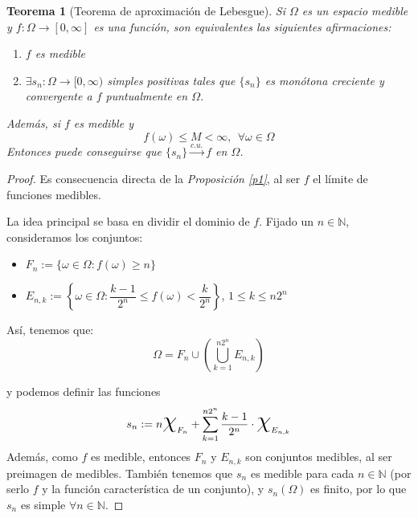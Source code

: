 \documentclass[11pt, a4paper]{article}
\theoremstyle{theorem-style}
\newtheorem{nth}{Teorema}[section]
\theoremstyle{definition-style}
\theoremstyle{remark-style}
\theoremstyle{example-style}
\newenvironment{nlist}
{\begin{enumerate}
    \renewcommand\labelenumi{(\emph{\roman{enumi})}}}
  {\end{enumerate}}
\begin{document}
\begin{nth}[Teorema de aproximación de Lebesgue]
  Si $\Omega$ es un espacio medible y $f:\Omega \to [0,\infty]$ es una función, son equivalentes las siguientes afirmaciones:
  \begin{nlist}
  \item $f$ es medible
  \item $\exists s_n : \Omega \to [0,\infty)$ simples positivas tales que $\{s_n\}$ es monótona creciente y convergente a $f$ puntualmente en $\Omega$.
  \end{nlist}
  Además, si $f$ es medible y
  \[
    f(\omega) \leq M < \infty, \ \ \forall \omega \in \Omega
  \]
  Entonces puede conseguirse que $\{s_n\}\xrightarrow{c.u.}f$ en $\Omega$.
\end{nth}
\begin{proof}\hfill

  Es consecuencia directa de la \textit{Proposición \ref{p1}}, al ser $f$ el límite de funciones medibles.
  
   La idea principal se basa en dividir el dominio de $f$. Fijado un $n \in \mathbb{N}$, consideramos los conjuntos: 
    \begin{itemize}
      \item $F_n := \{\omega \in \Omega : f(\omega) \geq n\}$\\
      \item $E_{n,k} := \left\{\omega \in \Omega : \dfrac{k-1}{2^n} \leq f(\omega) < \dfrac{k}{2^n}\right\}$,  $1 \leq k \leq n2^n$\\
    \end{itemize}
  
  
  Así, tenemos que:
  \[
    \Omega = F_n \cup \left( \bigcup_{k=1}^{n2^n}E_{n,k} \right)
  \]
  
  y podemos definir las funciones
  \[
    s_n := n\text{\huge {$\chi$}}_{F_n} + \sum_{k=1}^{n2^n}\dfrac{k-1}{2^n}\cdot \text{\huge {$\chi$}}_{E_{n,k}}
  \]
  Además, como $f$ es medible, entonces $F_n$ y $E_{n,k}$ son conjuntos medibles, al ser preimagen de medibles. También tenemos que $s_n$ es medible para cada $n \in \mathbb{N}$ (por serlo $f$ y la función característica de un conjunto), y $s_n(\Omega)$ es finito, por lo que $s_n$ es simple $\forall n \in \mathbb{N}$.


\end{proof}
\end{document}
